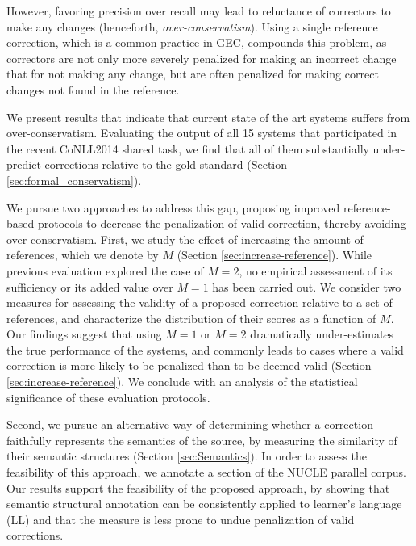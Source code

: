 \documentclass[letter,11pt]{article}
\begin{document}
However, favoring precision over recall may lead to reluctance of correctors to
make any changes (henceforth, {\it over-conservatism}).
Using a single reference correction, which is a common practice in GEC, compounds this problem,
as correctors are not only more severely penalized for making an incorrect change that for not making
any change, but are often penalized for making correct changes not found in the reference.

We present results that indicate that current state of the art systems suffers
from over-conservatism. Evaluating the output of all 15 systems that participated
in the recent CoNLL2014 shared task, we find that all of them
substantially under-predict corrections relative to the gold standard
(Section \ref{sec:formal_conservatism}). 

We pursue two approaches to address this gap, proposing
improved reference-based protocols to decrease the penalization of valid correction,
thereby avoiding over-conservatism.
First, we study the effect of increasing the amount of references,
which we denote by $M$ (Section \ref{sec:increase-reference}).
While previous evaluation explored the case of $M=2$,
no empirical assessment of its sufficiency or its added value over $M=1$
has been carried out.
We consider two measures for
assessing the validity of a proposed correction relative to a set of references,
and characterize the distribution of their scores as a function of $M$.
Our findings suggest that using $M=1$ or $M=2$ dramatically under-estimates
the true performance of the systems, and commonly leads to cases where a valid
correction is more likely to be penalized than to be deemed valid
(Section \ref{sec:increase-reference}). 
We conclude with an analysis of
the statistical significance of these evaluation protocols.

Second, we pursue an alternative way of determining whether a correction faithfully
represents the semantics of the source, by measuring the
similarity of their semantic structures (Section \ref{sec:Semantics}).
In order to assess the feasibility of this approach, we annotate a
section of the NUCLE \cite{dahlmeier2013building}
parallel corpus. Our results support the feasibility of the proposed approach,
by showing that semantic structural annotation can be consistently applied
to learner's language (LL) and that the measure is less prone to undue penalization of
valid corrections.
\end{document}
